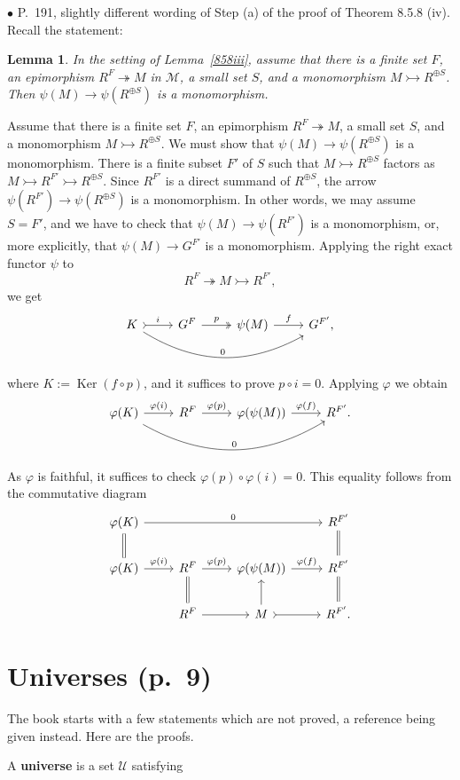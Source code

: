 \documentclass[12pt]{article}
\newtheorem{lem}[thm]{Lemma}
\theoremstyle{remark}%
\newcommand{\bu}{\bullet}
\newcommand{\n}{\noindent}
\newcommand{\M}{\mathcal M}
\newcommand{\epi}{\twoheadrightarrow}
\newcommand{\m}{\rightarrowtail}
\newcommand{\p}{\varphi}
\newcommand{\pf}{\n{\em Proof. }}
\DeclareMathOperator{\Ker}{Ker}
\begin{document}

\n$\bu$ P.~191, slightly different wording of Step (a) of the proof of Theorem 8.5.8 (iv). Recall the statement: 
%
\begin{lem}
%
In the setting of Lemma~\ref{858iii}, assume that there is a finite set $F$, an epimorphism $R^F\epi M$ in $\M$, a small set $S$, and a monomorphism $M\m R^{\oplus S}$. Then $\psi(M)\to\psi(R^{\oplus S})$ is a monomorphism. 
%
\end{lem}
%
\pf Assume that there is a finite set $F$, an epimorphism $R^F\epi M$, a small set $S$, and a monomorphism $M\m R^{\oplus S}$. We must show that $\psi(M)\to\psi(R^{\oplus S})$ is a monomorphism. There is a finite subset $F'$ of $S$ such that $M\m R^{\oplus S}$ factors as $M\m R^{F'}\m R^{\oplus S}$. Since $R^{F'}$ is a direct summand of $R^{\oplus S}$, the arrow $\psi(R^{F'})\to\psi(R^{\oplus S})$ is a monomorphism. In other words, we may assume $S=F'$, and we have to check that $\psi(M)\to\psi(R^{F'})$ is a monomorphism, or, more explicitly, that $\psi(M)\to G^{F'}$ is a monomorphism. Applying the right exact functor $\psi$ to 
$$
R^F\epi M\m R^{F'},
$$
we get 
$$
\begin{tikzcd}
K\ar[tail]{r}{i}\ar[bend right]{rrr}{0}&G^F\ar[two heads]{r}{p}&\psi(M)\ar{r}{f}&G^{F'},
\end{tikzcd}
$$
where $K:=\Ker(f\circ p)$, and it suffices to prove $p\circ i=0$. Applying $\p$ we obtain
$$
\begin{tikzcd}
\p(K)\ar{r}{\p(i)}\ar[bend right]{rrr}{0}&R^F\ar{r}{\p(p)}&\p(\psi(M))\ar{r}{\p(f)}&R^{F'}.
\end{tikzcd}
$$
As $\p$ is faithful, it suffices to check $\p(p)\circ\p(i)=0$. This equality follows from the commutative diagram
$$
\begin{tikzcd}
\p(K)\ar[equal]{d}\ar{rrr}{0}&&&R^{F'}\ar[equal]{d}\\
\p(K)\ar{r}{\p(i)}&R^F\ar[equal]{d}\ar{r}{\p(p)}&\p(\psi(M))\ar{r}{\p(f)}&R^{F'}\ar[equal]{d}\\
&R^F\ar{r}&M\ar[tail]{r}\ar{u}&R^{F'}.
\end{tikzcd}
$$
%
\section{Universes (p.~9)} %
%
The book starts with a few statements which are not proved, a reference being given instead. Here are the proofs.

A \textbf{universe} is a set $\mathcal U$ satisfying 
\end{document}
